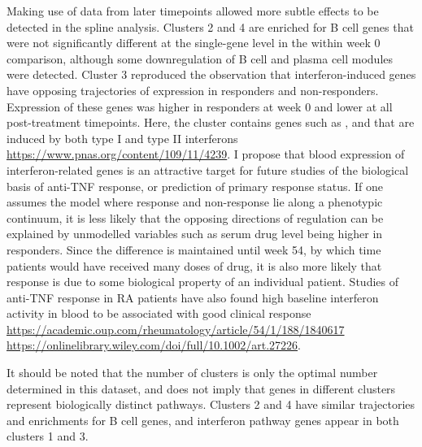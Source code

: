 Making use of data from later timepoints allowed more subtle effects to be detected in the spline analysis.
Clusters 2 and 4 are enriched for B cell genes that were not significantly different at the single-gene level in the within week 0 comparison,
although some downregulation of B cell and plasma cell modules were detected.
Cluster 3 reproduced the observation that interferon-induced genes have opposing trajectories of expression in responders and non-responders.
Expression of these genes was higher in responders at week 0 and lower at all post-treatment timepoints.
Here, the cluster contains genes such as ,  and  that are induced by both type I and type II interferons \url{https://www.pnas.org/content/109/11/4239}.
I propose that blood expression of interferon-related genes is an attractive target for future studies of the biological basis of anti-\gls{TNF} response,
or prediction of primary response status.
If one assumes the model where response and non-response lie along a phenotypic continuum,
it is less likely that the opposing directions of regulation can be explained by unmodelled variables such as serum drug level being higher in responders.
Since the difference is maintained until week 54, by which time patients would have received many doses of drug,
it is also more likely that response is due to some biological property of an individual patient.
Studies of anti-\gls{TNF} response in \gls{RA} patients have also 
found high baseline interferon activity in blood to be associated with good clinical response
\url{https://academic.oup.com/rheumatology/article/54/1/188/1840617}
\url{https://onlinelibrary.wiley.com/doi/full/10.1002/art.27226}.

It should be noted that the number of clusters is only the optimal number determined in this dataset,
and does not imply that genes in different clusters represent biologically distinct pathways.
Clusters 2 and 4 have similar trajectories and enrichments for B cell genes,
and interferon pathway genes appear in both clusters 1 and 3.

